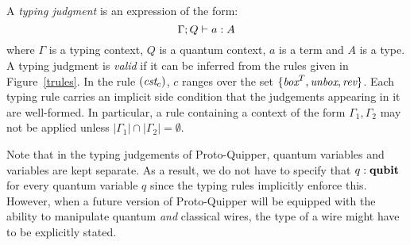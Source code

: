 \documentclass[twoside]{article}
\begin{document}
\begin{definition}
A \emph{typing judgment} is an expression of the form:
\[
\Gamma ; Q \vdash a:A
\] 
where $\Gamma$ is a typing context, $Q$ is a quantum context, 
$a$ is a term and $A$ is a type. A typing judgment is \emph{valid} if 
it can be inferred from the rules given in Figure~\hyperref[trules]{\ref*{trules}}. In the rule $(\textit{cst}_c)$, 
$c$ ranges over the set $\{\mathop{\textit{box}}\nolimits^T, \mathop{\textit{unbox}}\nolimits, \mathop{\textit{rev}}\nolimits\}$. Each typing rule
carries an implicit side condition that the judgements appearing in it
are well-formed. In particular, a rule containing a context of the form
$\Gamma_1,\Gamma_2$ may not be applied unless
$|\Gamma_1|\cap|\Gamma_2|=\emptyset$. 
\end{definition}

Note that in the typing judgements of Proto-Quipper, quantum variables
and variables are kept separate. As a result, we do not have to specify
that $q:\textrm{\bf qubit}$ for every quantum variable $q$ since the typing rules
implicitly enforce this. However, when a future version of
Proto-Quipper will be equipped with the ability to manipulate quantum
\emph{and} classical wires, the type of a wire might have to be
explicitly stated.

\end{document}
